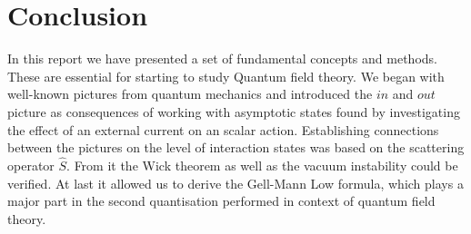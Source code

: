 \documentclass[12pt, titlepage]{article}
\begin{document}
\section{Conclusion}
In this report we have presented a set of fundamental concepts and methods. These are essential for starting to study Quantum field theory. We began with well-known pictures from quantum mechanics and introduced the $ in $ and $ out $ picture as consequences of working with asymptotic states found by investigating the effect of an external current on an scalar action. Establishing connections between the pictures on the level of interaction states was based on the scattering operator $ \hat{S} $. From it the Wick theorem as well as the vacuum instability could be verified. At last it allowed us to derive the Gell-Mann Low formula, which plays a major part in the second quantisation performed in context of quantum field theory. 
\newpage
\end{document}
